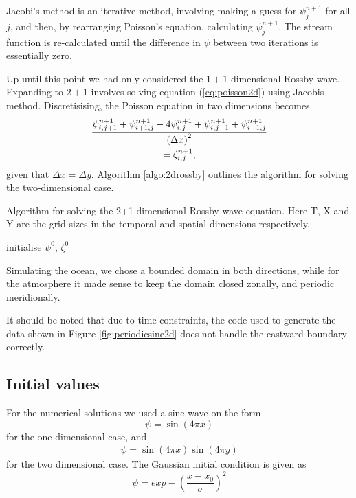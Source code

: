 Jacobi's method is an iterative method, involving making a guess for $\psi^{n+1}_j$ for all $j$, and then, by rearranging Poisson's equation, calculating $\psi_j^{n+1}$. The stream function is re-calculated until the difference in $\psi$ between two iterations is essentially zero.

Up until this point we had only considered the $1 + 1$ dimensional Rossby wave. Expanding to $2 + 1$ involves solving equation (\ref{eq:poisson2d}) using Jacobis method. Discretisising, the Poisson equation in two dimensions becomes
	\begin{multline}
	\label{eq:poissondiscret}
	\frac{\psi^{n+1}_{i,j+1} + \psi^{n+1}_{i+1,j} - 4\psi^{n+1}_{i,j} + \psi^{n+1}_{i,j-1}+ \psi^{n+1}_{i-1,j}}{\qty(\Delta x)^2} \\= \zeta^{n+1}_{i,j},
	\end{multline}
given that $\Delta x = \Delta y$. Algorithm \ref{algo:2drossby} outlines the algorithm for solving the two-dimensional case.

\begin{algorithm}[htbp]
	\caption{Algorithm for solving the 2+1 dimensional Rossby wave equation. Here T, X and Y are the grid sizes in the temporal and spatial dimensions respectively.}
	\SetAlgoLined
	\BlankLine
	\BlankLine
	initialise $\psi^0,\, \zeta^0$\;
	\BlankLine
	\BlankLine
	\label{algo:2drossby}
\end{algorithm}

Simulating the ocean, we chose a bounded domain in both directions, while for the atmosphere it made sense to keep the domain closed zonally, and periodic meridionally.

It should be noted that due to time constraints, the code used to generate the data shown in Figure \ref{fig:periodicsine2d} does not handle the eastward boundary correctly.

\subsection{Initial values}
For the numerical solutions we used a sine wave on the form 
\begin{equation}
	\psi = \sin{(4\pi x)}
\end{equation}
for the one dimensional case, and 
\begin{eqnarray}
	\psi = \sin(4\pi x)\sin(4\pi y)
\end{eqnarray} 
for the two dimensional case. 
The Gaussian initial condition is given as
\begin{equation}
	\psi = exp-\left(\frac{x-x_0}{\sigma} \right)^2
\end{equation}


